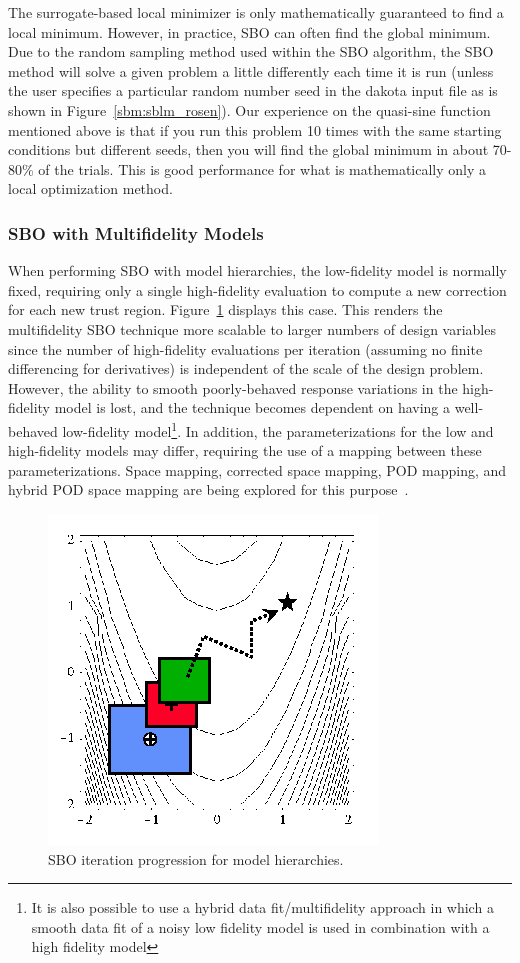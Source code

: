 The surrogate-based local minimizer is only mathematically
guaranteed to find a local minimum. However, in practice, SBO can often find 
the global minimum.  Due to the random sampling method used within the
SBO algorithm, the SBO method will solve a given problem a little differently 
each time it is run (unless the user specifies a particular random
number seed in the dakota input file as is shown in Figure~\ref{sbm:sblm_rosen}). 
Our experience on the quasi-sine function mentioned above is that if 
you run this problem 10 times with the same starting conditions but different 
seeds, then you will find the global minimum in about 70-80\% of the trials.
This is good performance for what is mathematically only a local optimization method.

\subsubsection{SBO with Multifidelity Models}\label{adv_meth:sbm:sblm:multifidelity}

When performing SBO with model hierarchies, the low-fidelity model is
normally fixed, requiring only a single high-fidelity evaluation to
compute a new correction for each new trust region.
Figure~\ref{fig:sbo_mh} displays this case.  This renders the
multifidelity SBO technique more scalable to larger numbers of design
variables since the number of high-fidelity evaluations per iteration
(assuming no finite differencing for derivatives) is independent of
the scale of the design problem.  However, the ability to smooth
poorly-behaved response variations in the high-fidelity model is lost,
and the technique becomes dependent on having a well-behaved
low-fidelity model\footnote{It is also possible to use a hybrid data
fit/multifidelity approach in which a smooth data fit of a noisy low
fidelity model is used in combination with a high fidelity model}.  In
addition, the parameterizations for the low and high-fidelity models
may differ, requiring the use of a mapping between these
parameterizations.  Space mapping, corrected space mapping, POD
mapping, and hybrid POD space mapping are being explored for this
purpose~\cite{Rob06a,Rob06b}.

\begin{figure}
  \centering
  \includegraphics[width=.3\textwidth]{images/sbo_mh}
  \caption{SBO iteration progression for model hierarchies.}
  \label{fig:sbo_mh}
\end{figure}

